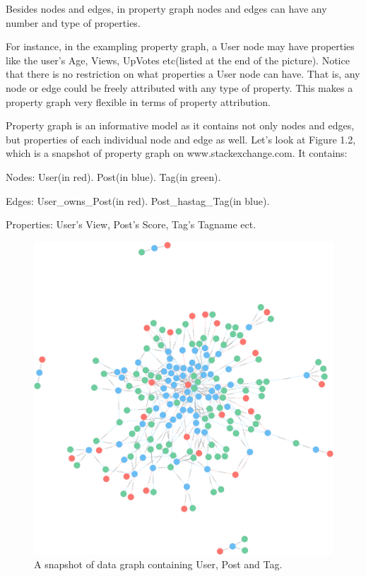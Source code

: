 Besides nodes and edges, in property graph nodes and edges can have any number and type of properties. 


For instance, in the exampling property graph, a User node may have properties like the user’s Age, Views, UpVotes etc(listed at the end of the picture). Notice that there is no restriction on what properties a User node can have.  That is, any node or edge could be freely attributed with any type of property. This makes a property graph very flexible in terms of property attribution.
 
Property graph is an informative model as it contains not only nodes and edges, but properties of each individual node and edge as well. Let's look at Figure 1.2, which is a snapshot of property graph on www.stackexchange.com. It contains:

Nodes:	User(in red).
Post(in blue). 
Tag(in green). 
 
Edges: 		User\_owns\_Post(in red). 
Post\_hastag\_Tag(in blue).
 
Properties:	User’s View, Post’s Score, Tag’s Tagname ect.
 
\begin {figure}[H]
\centering
\includegraphics[scale=0.1]{pic/3.png}
\caption{A snapshot of data graph containing User, Post and Tag.}
\end{figure}

